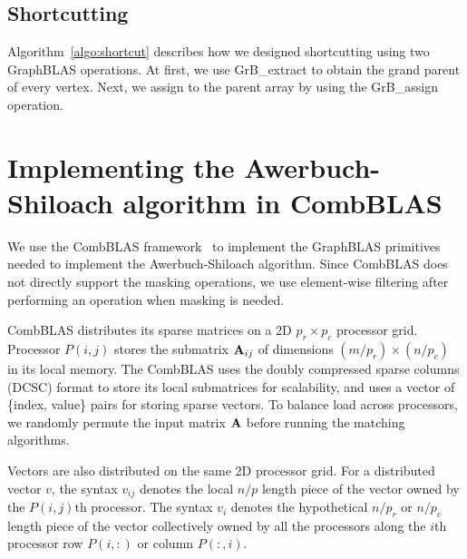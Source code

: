 \subsection{Shortcutting}
Algorithm~\ref{algo:shortcut} describes how we designed shortcutting using two GraphBLAS operations.
At first, we use  GrB\_extract to obtain the grand parent  of every vertex. Next, we assign  to the parent array by using the GrB\_assign operation.


\section{Implementing the Awerbuch-Shiloach algorithm in CombBLAS}
We use the CombBLAS framework~\cite{bulucc2011combinatorial} to implement the GraphBLAS primitives needed to implement the Awerbuch-Shiloach algorithm.
Since CombBLAS does not directly support the masking operations, we use element-wise filtering after performing an operation when masking is needed. 

CombBLAS distributes its sparse matrices on a 2D $p_r \times p_c$ processor grid.
Processor $P(i,j)$ stores the submatrix $\mathbf{A}_{ij}$ of dimensions $(m/p_r)\times (n/p_c)$ in its local memory. 
The CombBLAS uses the doubly compressed sparse columns (DCSC) format to store its local submatrices for scalability, 
and uses a vector of \{index, value\} pairs for storing sparse vectors. 
To balance load across processors, we randomly permute the input matrix $\mathbf{A}$ before running the matching algorithms.

Vectors are also distributed on the same 2D processor grid. 
For a distributed vector $v$, the syntax $v_{ij}$ denotes the local $n/p$ length piece of the vector owned by the $P(i, j)$th processor. 
The syntax $v_i$ denotes the hypothetical $n/p_r$ or $n/p_c$ length piece of the vector collectively owned by all the processors along the $i$th processor row $P(i, :)$ or column $P(:, i)$.


%

